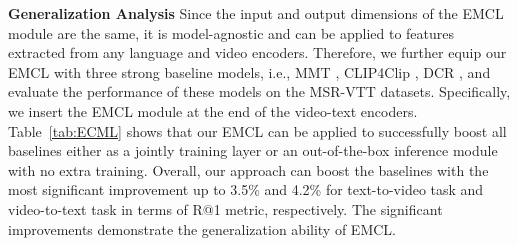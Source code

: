 \documentclass{article}
\newcommand{\myparagraph}[1]{\textbf{#1}\hspace{1.8ex}}
\begin{document}
\myparagraph{Generalization Analysis}
Since the input and output dimensions of the EMCL module are the same, it is model-agnostic and can be applied to features extracted from any language and video encoders. 
Therefore, we further equip our EMCL with three strong baseline models, i.e., MMT \cite{gabeur2020multi}, CLIP4Clip \cite{luo2021clip4clip}, DCR \cite{wang2022disentangled}, and evaluate the performance of these models on the MSR-VTT datasets.
Specifically, we insert the EMCL module at the end of the video-text encoders.
Table~\ref{tab:ECML} shows that our EMCL can be applied to successfully boost all baselines either as a jointly training layer or an out-of-the-box inference module with no extra training. Overall, our approach can boost the baselines with the most significant improvement up to 3.5\% and 4.2\% for text-to-video task and video-to-text task in terms of R@1 metric, respectively. The significant improvements demonstrate the generalization ability of EMCL. 
\end{document}
